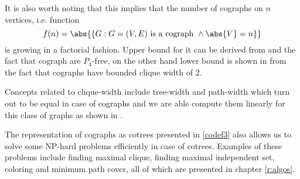 It is also worth noting that this implies that the number of cographs on $n$ vertices, i.e. function
\[
    f(n) = \abs{\{G : G = (V,E) \text{ is a cograph } \land \abs{V} = n\}}
\]
is growing in a factorial fashion. Upper bound for it can be derived from \cite{lozin} and the fact that cograph are $P_4$-free, on the other hand lower bound is shown in \cite{allen} from the fact that cographs have bounded clique width of 2.

Concepts related to clique-width include tree-width and path-width which turn out to be equal in case of cographs and we are able compute them linearly for this class of graphs as shown in \cite{bodlaender}.

The representation of cographs as cotrees presented in \ref{codef3} also allows us to solve some NP-hard problems efficiently in case of cotrees. Examples of these problems include finding maximal clique, finding maximal independent set, coloring and minimum path cover, all of which are presented in chapter \ref{r:algos}.